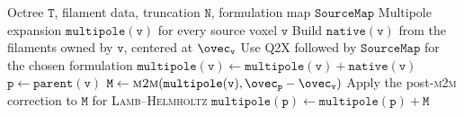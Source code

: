 \begin{algorithm}[h]
  \caption{Upward pass with \textsc{m2m}}
  \label{alg:upward_pass}
  \begin{algorithmic}
    \Require Octree $\mathtt{T}$, filament data, truncation $\mathtt{N}$, formulation map $\mathtt{SourceMap}$
    \Ensure Multipole expansion $\mathtt{multipole}(\mathtt{v})$ for every source voxel $\mathtt{v}$
          \State Build $\mathtt{native}(\mathtt{v})$ from the filaments owned by $\mathtt{v}$, centered at $\ovec_{\mathtt{v}}$
          \State Use \textsc{Q2X} followed by $\mathtt{SourceMap}$ for the chosen formulation
          \State $\mathtt{multipole}(\mathtt{v}) \gets \mathtt{multipole}(\mathtt{v}) + \mathtt{native}(\mathtt{v})$
        \EndIf
          \State $\mathtt{p} \gets \mathtt{parent}(\mathtt{v})$
          \State $\mathtt{M} \gets \textsc{m2m}(\mathtt{multipole}(\mathtt{v}), \ovec_{\mathtt{p}} - \ovec_{\mathtt{v}})$
          \State Apply the post-\textsc{m2m} correction to $\mathtt{M}$ for \textsc{Lamb}--\textsc{Helmholtz}
          \State $\mathtt{multipole}(\mathtt{p}) \gets \mathtt{multipole}(\mathtt{p}) + \mathtt{M}$
        \EndIf
      \EndFor
    \EndFor
  \end{algorithmic}
\end{algorithm}


